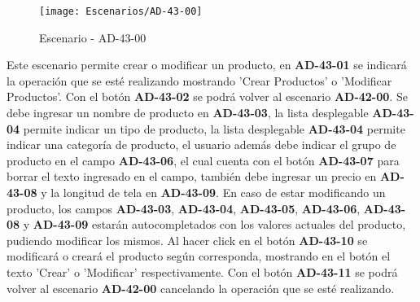 \begin{figure}[H]
\centering
\texttt{[image: Escenarios/AD-43-00]}
\caption{Escenario - AD-43-00}
\label{fig:AD-43-00}
\end{figure}

Este escenario permite crear o modificar un producto, en \textbf{AD-43-01} se indicará la operación que se esté realizando mostrando 'Crear Productos' o 'Modificar Productos'. Con el botón \textbf{AD-43-02} se podrá volver al escenario \textbf{AD-42-00}. Se debe ingresar un nombre de producto en \textbf{AD-43-03}, la lista desplegable \textbf{AD-43-04} permite indicar un tipo de producto, la lista desplegable \textbf{AD-43-04} permite indicar una categoría de producto, el usuario además debe indicar el grupo de producto en el campo \textbf{AD-43-06}, el cual cuenta con el botón \textbf{AD-43-07} para borrar el texto ingresado en el campo, también debe ingresar un precio en \textbf{AD-43-08} y la longitud de tela en \textbf{AD-43-09}. En caso de estar modificando un producto, los campos \textbf{AD-43-03}, \textbf{AD-43-04}, \textbf{AD-43-05}, \textbf{AD-43-06}, \textbf{AD-43-08} y \textbf{AD-43-09} estarán autocompletados con los valores actuales del producto, pudiendo modificar los mismos. Al hacer click en el botón \textbf{AD-43-10} se modificará o creará el producto según corresponda, mostrando en el botón el texto 'Crear' o 'Modificar' respectivamente. Con el botón \textbf{AD-43-11} se podrá volver al escenario \textbf{AD-42-00} cancelando la operación que se esté realizando.
\\